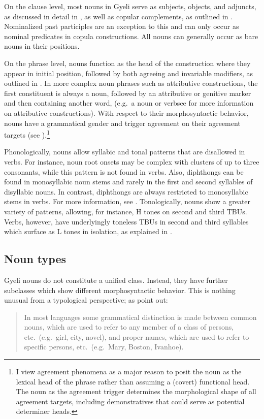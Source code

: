 On the clause level, most nouns in Gyeli serve as subjects, objects, and adjuncts, as discussed in detail in , as well as copular complements, as outlined in . Nominalized past participles are an exception to this and can only occur as nominal predicates in copula constructions. All nouns can generally occur as bare nouns in their positions.

On the phrase level, nouns function as the head of the construction where they appear in initial position, followed by both agreeing and invariable modifiers, as outlined in . In more complex noun phrases such as attributive constructions, the first constituent is always a noun, followed by an attributive or genitive marker and then containing another word, (e.g.\ a noun or verb{\textemdash}see  for more information on attributive constructions).
With respect to their morphosyntactic behavior, nouns have a grammatical gender and trigger agreement on their agreement targets (see ).\footnote{I view agreement phenomena as a major reason to posit the noun as the lexical head of the phrase rather than assuming a (covert) functional head. The noun as the agreement trigger determines the morphological shape of all agreement targets, including demonstratives that could serve as potential determiner heads.}


Phonologically, nouns allow syllabic and tonal patterns that are disallowed in verbs. For instance, noun root onsets may be complex with clusters of up to three consonants, while this pattern is not found in verbs. Also, diphthongs can be found in monosyllabic noun stems and rarely in the first and second syllables of disyllabic nouns. In contrast, diphthongs are always restricted to monosyllabic stems in verbs. For more information, see .  
Tonologically, nouns show a greater variety of patterns, allowing, for instance, H tones on second and third TBUs. Verbs, however, have underlyingly toneless TBUs in second and third syllables which surface as L tones in isolation, as explained in .


\subsection{Noun types}
\label{sec:Ntyp}

Gyeli nouns do not constitute a unified class. Instead, they have further subclasses which show different morphosyntactic behavior. This is nothing unusual from a typological perspective; as \citet[8]{schachter2007} point out:
\begin{quote} In most languages some grammatical distinction is made between common nouns, which are used to refer to any member of a class of persons, etc.\ (e.g.\ girl, city, novel), and proper names, which are used to refer to specific persons, etc.\ (e.g.\ Mary, Boston, Ivanhoe). \end{quote}

